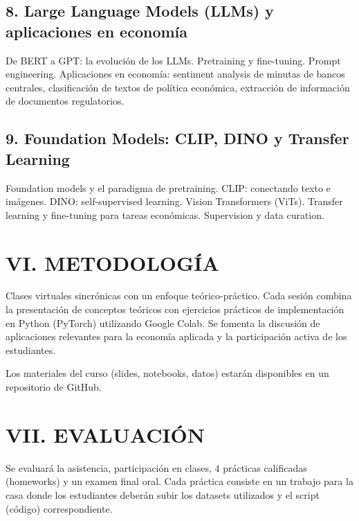 \documentclass[11pt,a4paper]{article}
\begin{document}
\subsection*{8. Large Language Models (LLMs) y aplicaciones en econom\'ia}

De BERT a GPT: la evoluci\'on de los LLMs. Pretraining y fine-tuning. Prompt engineering. Aplicaciones en econom\'ia: sentiment analysis de minutas de bancos centrales, clasificaci\'on de textos de pol\'itica econ\'omica, extracci\'on de informaci\'on de documentos regulatorios.

\subsection*{9. Foundation Models: CLIP, DINO y Transfer Learning}

Foundation models y el paradigma de pretraining. CLIP: conectando texto e im\'agenes. DINO: self-supervised learning. Vision Transformers (ViTs). Transfer learning y fine-tuning para tareas econ\'omicas. Supervision y data curation.

\section*{VI. METODOLOG\'IA}

Clases virtuales sincr\'onicas con un enfoque te\'orico-pr\'actico. Cada sesi\'on combina la presentaci\'on de conceptos te\'oricos con ejercicios pr\'acticos de implementaci\'on en Python (PyTorch) utilizando Google Colab. Se fomenta la discusi\'on de aplicaciones relevantes para la econom\'ia aplicada y la participaci\'on activa de los estudiantes.

Los materiales del curso (slides, notebooks, datos) estar\'an disponibles en un repositorio de GitHub.

\section*{VII. EVALUACI\'ON}

Se evaluar\'a la asistencia, participaci\'on en clases, 4 pr\'acticas calificadas (homeworks) y un examen final oral. Cada pr\'actica consiste en un trabajo para la casa donde los estudiantes deber\'an subir los datasets utilizados y el script (c\'odigo) correspondiente.
\end{document}
